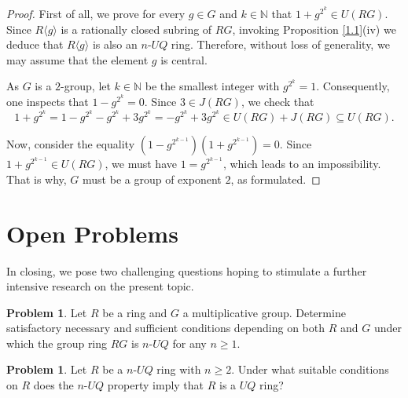 \documentclass[12pt]{amsart}
\theoremstyle{definition}
\newtheorem{problem}[theorem]{Problem}
\begin{document}
\begin{proof}
First of all, we prove for every $g \in G$ and $k \in \mathbb{N}$ that $1+g^{2^k} \in U(RG)$. Since $R\langle g\rangle$ is a rationally closed subring of $RG$, invoking Proposition \ref{1.1}(iv) we deduce that $R\langle g\rangle$ is also an $n$-$UQ$ ring. Therefore, without loss of generality, we may assume that the element $g$ is central.

As $G$ is a $2$-group, let $k \in \mathbb{N}$ be the smallest integer with $g^{2^k}=1$. Consequently, one inspects that $1-g^{2^k}=0$. Since $3 \in J(RG)$, we check that
\[
1+g^{2^k} = 1-g^{2^k} - g^{2^k} + 3g^{2^k} = -g^{2^k} + 3g^{2^k} \in U(RG) + J(RG) \subseteq U(RG).
\]

Now, consider the equality $(1-g^{2^{k-1}})(1+g^{2^{k-1}})=0$. Since $1+g^{2^{k-1}} \in U(RG)$, we must have $1=g^{2^{k-1}}$, which leads to an impossibility. That is why, $G$ must be a group of exponent $2$, as formulated.
\end{proof}

\section{Open Problems}

In closing, we pose two challenging questions hoping to stimulate a further intensive research on the present topic.

\begin{problem}
Let $R$ be a ring and $G$ a multiplicative group. Determine satisfactory necessary and sufficient conditions depending on both $R$ and $G$ under which the group ring $RG$ is $n$-$UQ$ for any $n\geq 1$.
\end{problem}

\begin{problem}
Let $R$ be a $n$-$UQ$ ring with $n\geq2$. Under what suitable conditions on $R$ does the $n$-$UQ$ property imply that $R$ is a $UQ$ ring?
\end{problem}

\vskip1.0pc
\end{document}
